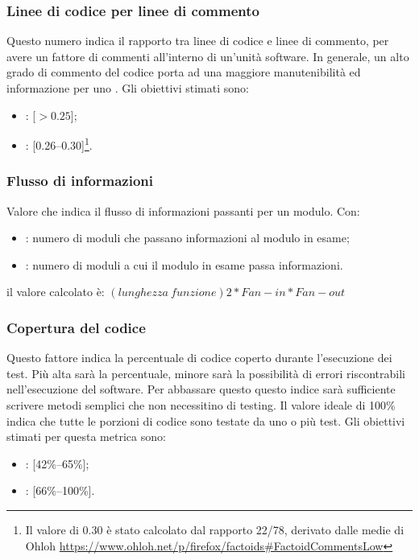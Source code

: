 \subsubsection{Linee di codice per linee di commento}
\label{4.2.5}
Questo numero indica il rapporto tra linee di codice e linee di commento, per avere un fattore di commenti all'interno di un'unità software. In generale, un alto grado di commento del codice porta ad una maggiore manutenibilità ed informazione per uno .
Gli obiettivi stimati sono:
\begin{itemize}
\item {}: [$>0.25$];
\item {}: [0.26--0.30]\footnote{Il valore di 0.30 è stato calcolato dal rapporto 22/78, derivato dalle medie di Ohloh \url{https://www.ohloh.net/p/firefox/factoids\#FactoidCommentsLow}}.
\end{itemize}

\subsubsection{Flusso di informazioni}
\label{4.2.6}
Valore che indica il flusso di informazioni passanti per un modulo.
Con:
\begin{itemize}
\item {}: numero di moduli che passano informazioni al modulo in esame;
\item {}: numero di moduli a cui il modulo in esame passa informazioni.
\end{itemize}
il valore calcolato è:
\begin{math}(lunghezza\:funzione)2 * Fan-in * Fan-out\end{math}

\subsubsection{Copertura del codice}
\label{4.2.9}
Questo fattore indica la percentuale di codice coperto durante l'esecuzione dei test. Più alta sarà la percentuale, minore sarà la possibilità di errori riscontrabili nell'esecuzione del software. Per abbassare questo questo indice sarà sufficiente scrivere metodi semplici che non necessitino di testing. Il valore ideale di 100\% indica che tutte le porzioni di codice sono testate da uno o più test.
Gli obiettivi stimati per questa metrica sono:
\begin{itemize}
\item {}: [42\%--65\%];
\item {}: [66\%--100\%].
\end{itemize}

